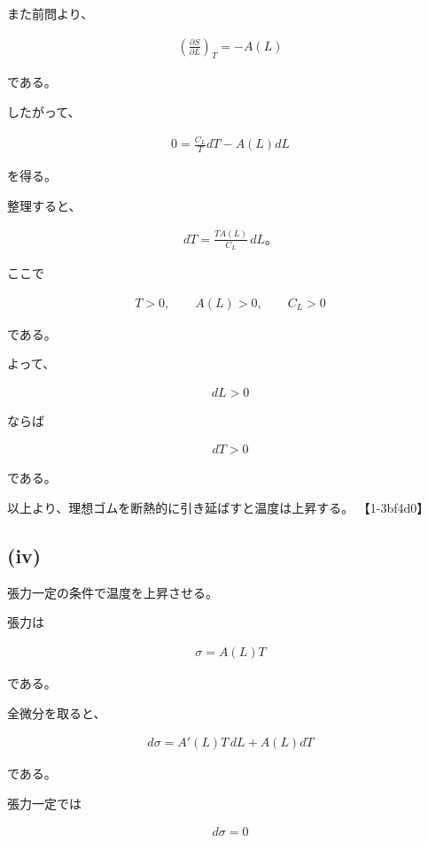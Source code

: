 \documentclass[platex,dvipdfmx,a4paper]{jsarticle}
\begin{document}
また前問より、

\begin{align*}
\left(
\frac{\partial S}{\partial L}
\right)_T
=
-A(L)
\end{align*}

である。

したがって、

\begin{align*}
0
=
\frac{C_L}{T}dT
-
A(L)dL
\end{align*}

を得る。

整理すると、

\begin{align*}
dT
=
\frac{TA(L)}{C_L}
\,dL。
\end{align*}

ここで

\begin{align*}
T>0,
\qquad
A(L)>0,
\qquad
C_L>0
\end{align*}

である。

よって、

\begin{align*}
dL>0
\end{align*}

ならば

\begin{align*}
dT>0
\end{align*}

である。

以上より、理想ゴムを断熱的に引き延ばすと温度は上昇する。 【1-3bf4d0】

\subsection{(iv)}

張力一定の条件で温度を上昇させる。

張力は

\begin{align*}
\sigma
=
A(L)T
\end{align*}

である。

全微分を取ると、

\begin{align*}
d\sigma
=
A'(L)T\,dL
+
A(L)dT
\end{align*}

である。

張力一定では

\begin{align*}
d\sigma=0
\end{align*}
\end{document}
